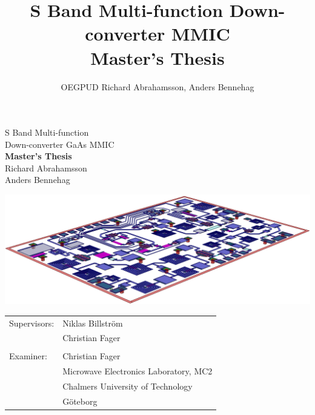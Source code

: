 \title{S Band Multi-function Down-converter MMIC \\ Master's Thesis}
\author{OEGPUD Richard Abrahamsson, Anders Bennehag}
\date{\mytoday}
\documentreference{}

\begin{center}
\vspace*{25pt}
{\Huge S Band Multi-function \\
\vspace*{5pt}
Down-converter GaAs MMIC} \\
\vspace{40pt}
{\Large \textbf{Master's Thesis} \\
Richard Abrahamsson \\
\vspace{2pt}
Anders Bennehag} \\
\vspace{30pt}

\vspace{40pt}
\includegraphics[width=1.0\textwidth]{fig/front_v3}

\vfill
\begin{tabular}{ll}
	Supervisors: & Niklas Billström \\
				 & Christian Fager \\
				 & \\
	Examiner:	 & Christian Fager \\
				 & Microwave Electronics Laboratory, MC2 \\
				 & Chalmers University of Technology \\
				 & Göteborg
\end{tabular}
\end{center}

